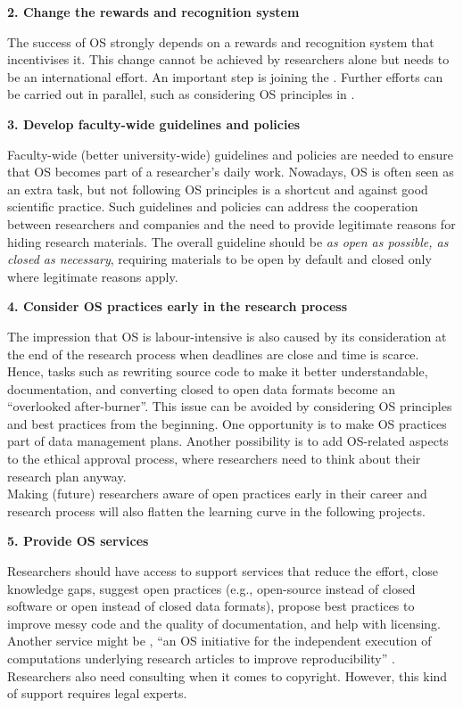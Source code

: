 \documentclass[gc, manuscript]{copernicus}
\begin{document}
\textbf{2. Change the rewards and recognition system}

The success of OS strongly depends on a rewards and recognition system
that incentivises it. This change cannot be achieved by researchers
alone but needs to be an international effort. An important step is
joining the
\href{https://ec.europa.eu/info/news/process-towards-agreement-reforming-research-assessment-2022-jan-18_en}{\color{blue}{EU's process toward an agreement on reforming research assessment}}.
Further efforts can be carried out in parallel, such as considering OS
principles in
\href{https://www.nicebread.de/open-science-hiring-practices/}{\color{blue}{hiring decisions}}.

\textbf{3. Develop faculty-wide guidelines and policies}

Faculty-wide (better university-wide) guidelines and policies are needed
to ensure that OS becomes part of a researcher's daily work. Nowadays,
OS is often seen as an extra task, but not following OS principles is a
shortcut and against good scientific practice. Such guidelines and
policies can address the cooperation between researchers and companies
and the need to provide legitimate reasons for hiding research
materials. The overall guideline should be
\textit{as open as possible, as closed as necessary}, requiring
materials to be open by default and closed only where legitimate reasons
apply.

\textbf{4. Consider OS practices early in the research process}

The impression that OS is labour-intensive is also caused by its
consideration at the end of the research process when deadlines are
close and time is scarce. Hence, tasks such as rewriting source code to
make it better understandable, documentation, and converting closed to
open data formats become an ``overlooked after-burner''. This issue can
be avoided by considering OS principles and best practices from the
beginning. One opportunity is to make OS practices part of data
management plans. Another possibility is to add OS-related aspects to
the ethical approval process, where researchers need to think about
their research plan anyway.\\
Making (future) researchers aware of open practices early in their
career and research process will also flatten the learning curve in the
following projects.

\textbf{5. Provide OS services}

Researchers should have access to support services that reduce the
effort, close knowledge gaps, suggest open practices (e.g., open-source
instead of closed software or open instead of closed data formats),
propose best practices to improve messy code and the quality of
documentation, and help with licensing. Another service might be
\href{https://www.itc.nl/research/open-science/codecheck/}{\color{blue}{CODECHECK}},
``an OS initiative for the independent execution of computations
underlying research articles to improve reproducibility''
\citep{N_st_2021}. Researchers also need consulting when it comes to
copyright. However, this kind of support requires legal experts.
\end{document}
